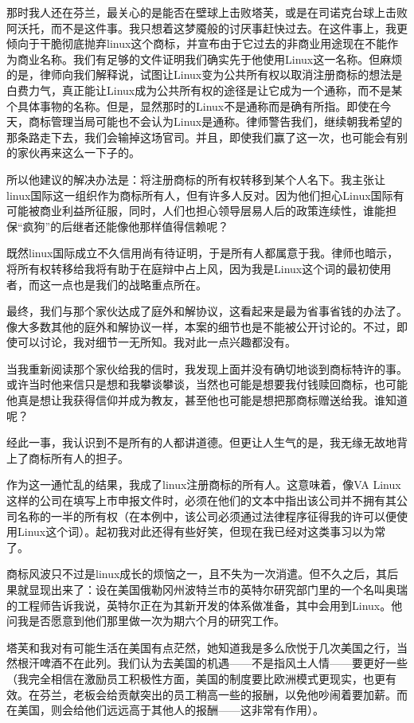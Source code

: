 那时我人还在芬兰，最关心的是能否在壁球上击败塔芙，或是在司诺克台球上击败阿沃托，而不是这件事。我只想着这梦魇般的讨厌事赶快过去。在这件事上，我更倾向于干脆彻底抛弃linux这个商标，并宣布由于它过去的非商业用途现在不能作为商业名称。我们有足够的文件证明我们确实先于他使用Linux这一名称。但麻烦的是，律师向我们解释说，试图让Linux变为公共所有权以取消注册商标的想法是白费力气，真正能让Linux成为公共所有权的途径是让它成为一个通称，而不是某个具体事物的名称。但是，显然那时的Linux不是通称而是确有所指。即使在今天，商标管理当局可能也不会认为Linux是通称。律师警告我们，继续朝我希望的那条路走下去，我们会输掉这场官司。并且，即使我们赢了这一次，也可能会有别的家伙再来这么一下子的。

所以他建议的解决办法是：将注册商标的所有权转移到某个人名下。我主张让linux国际这一组织作为商标所有人，但有许多人反对。因为他们担心Linux国际有可能被商业利益所征服，同时，人们也担心领导层易人后的政策连续性，谁能担保“疯狗”的后继者还能像他那样值得信赖呢？

既然linux国际成立不久信用尚有待证明，于是所有人都属意于我。律师也暗示，将所有权转移给我将有助于在庭辩中占上风，因为我是Linux这个词的最初使用者，而这一点也是我们的战略重点所在。

最终，我们与那个家伙达成了庭外和解协议，这看起来是最为省事省钱的办法了。像大多数其他的庭外和解协议一样，本案的细节也是不能被公开讨论的。不过，即使可以讨论，我对细节一无所知。我对此一点兴趣都没有。

当我重新阅读那个家伙给我的信时，我发现上面并没有确切地谈到商标特许的事。或许当时他来信只是想和我攀谈攀谈，当然也可能是想要我付钱赎回商标，也可能他真是想让我获得信仰并成为教友，甚至他也可能是想把那商标赠送给我。谁知道呢？

经此一事，我认识到不是所有的人都讲道德。但更让人生气的是，我无缘无故地背上了商标所有人的担子。

作为这一通忙乱的结果，我成了linux注册商标的所有人。这意味着，像VA Linux这样的公司在填写上市申报文件时，必须在他们的文本中指出该公司并不拥有其公司名称的一半的所有权（在本例中，该公司必须通过法律程序征得我的许可以便使用Linux这个词）。起初我对此还得有些好笑，但现在我已经对这类事习以为常了。

商标风波只不过是linux成长的烦恼之一，且不失为一次消遣。但不久之后，其后果就显现出来了：设在美国俄勒冈州波特兰市的英特尔研究部门里的一个名叫奥瑞的工程师告诉我说，英特尔正在为其新开发的体系做准备，其中会用到Linux。他问我是否愿意到他们那里做一次为期六个月的研究工作。

塔芙和我对有可能生活在美国有点茫然，她知道我是多么欣悦于几次美国之行，当然根汗啤酒不在此列。我们认为去美国的机遇——不是指风土人情——要更好一些（我完全相信在激励员工积极性方面，美国的制度要比欧洲模式更现实，也更有效。在芬兰，老板会给贡献突出的员工稍高一些的报酬，以免他吵闹着要加薪。而在美国，则会给他们远远高于其他人的报酬——这非常有作用）。

